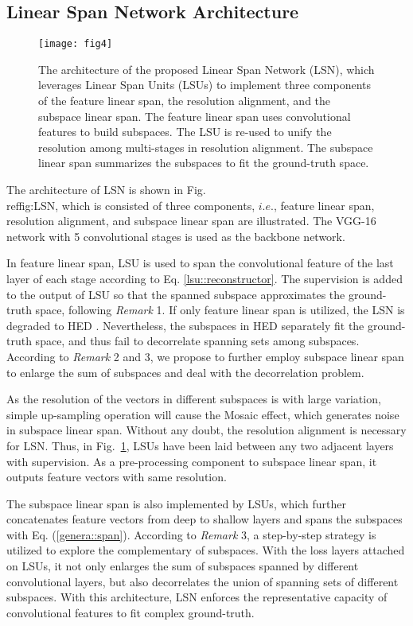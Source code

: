 \documentclass[runningheads]{llncs}
\begin{document}
\subsection{Linear Span Network Architecture}
\begin{figure}[t]
\centering
\texttt{[image: fig4]}
\caption{The architecture of the proposed Linear Span Network (LSN), which leverages Linear Span Units (LSUs) to implement three components of the feature linear span, the resolution alignment, and the subspace linear span. 
The feature linear span uses convolutional features to build subspaces. The LSU is re-used to unify the resolution among multi-stages in resolution alignment. The subspace linear span summarizes the subspaces to fit the ground-truth space. }
\label{fig:LSN}
\end{figure}



The architecture of LSN is shown in Fig.\\ref{fig:LSN}, which is consisted of three components, $i.e.$, feature linear span, resolution alignment, and subspace linear span are illustrated. The VGG-16 network with 5 convolutional stages \cite{ref34} is used as the backbone network. 

In feature linear span, LSU is used to span the convolutional feature of the last layer of each stage according to Eq. \ref{lsu::reconstructor}. The supervision is added to the output of LSU so that the spanned subspace approximates the ground-truth space, following \textit{Remark} 1. If only feature linear span is utilized, the LSN is degraded to HED \cite{ref6}. Nevertheless, the subspaces in HED separately fit the ground-truth space, and thus fail to decorrelate spanning sets among subspaces. According to \textit{Remark} 2 and 3, we propose to further employ subspace linear span to enlarge the sum of subspaces and deal with the decorrelation problem. 

As the resolution of the vectors in different subspaces is with large variation, simple up-sampling operation will cause the Mosaic effect, which generates noise in subspace linear span. Without any doubt, the resolution alignment is necessary for LSN. Thus, in Fig.~\ref{fig:LSN}, LSUs have been laid between any two adjacent layers with supervision. As a pre-processing component to subspace linear span, it outputs feature vectors with same resolution.

The subspace linear span is also implemented by LSUs, which further concatenates feature vectors from deep to shallow layers and spans the subspaces with Eq. (\ref{genera::span}). According to \textit{Remark} 3, a step-by-step strategy is utilized to explore the complementary of subspaces. With the loss layers attached on LSUs, it not only enlarges the sum of subspaces spanned by different convolutional layers, but also decorrelates the union of spanning sets of different subspaces. With this architecture, LSN enforces the representative capacity of convolutional features to fit complex ground-truth. 
\end{document}
